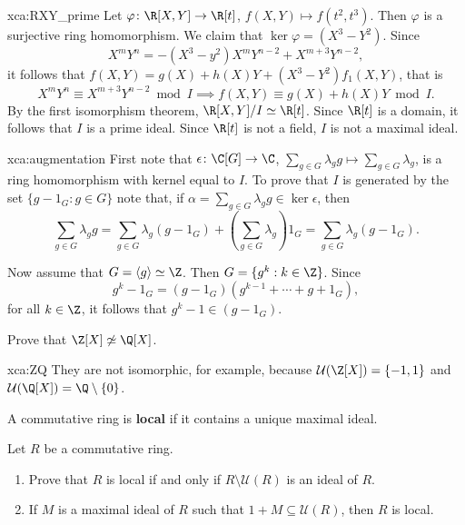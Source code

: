\begin{sol}{xca:RXY_prime}
	Let $\varphi\colon\R[X,Y]\to\R[t]$, $f(X,Y)\mapsto f(t^2,t^3)$. 
	Then $\varphi$ is a surjective ring homomorphism. We claim that
	$\ker\varphi=(X^3-Y^2)$. Since 
	\[
		X^mY^n=-(X^3-y^2)X^mY^{n-2}+X^{m+3}Y^{n-2}, 
	\]
	it follows
	that $f(X,Y)=g(X)+h(X)Y+(X^3-Y^2)f_1(X,Y)$, that is 
	\[
	X^mY^n\equiv X^{m+3}Y^{n-2}\bmod I
	\implies
	f(X,Y)\equiv g(X)+h(X)Y\bmod I.
	\]
	By the first isomorphism theorem, $\R[X,Y]/I\simeq\R[t]$. Since $\R[t]$ is
	a domain, it follows that $I$ is a prime ideal. 
	Since $\R[t]$ is not a
	field, $I$ is not a maximal ideal.
\end{sol}

\begin{sol}{xca:augmentation}
	First note that $\epsilon\colon\C[G]\to\C$, $\sum_{g\in G}\lambda_gg\mapsto \sum_{g\in G}\lambda_g$, 
	is a ring homomorphism with kernel equal to $I$. To prove
	that $I$ is generated by the set $\{g-1_G:g\in G\}$ note that, 
	if $\alpha=\sum_{g\in G}\lambda_gg\in \ker\epsilon$, then 
	\[
		\sum_{g\in G}\lambda_gg=\sum_{g\in G}\lambda_g(g-1_G)+\left(\sum_{g\in G}\lambda_g\right)1_G
		=\sum_{g\in G}\lambda_g(g-1_G).
	\]
	
	Now assume that $G=\langle g\rangle\simeq\Z$. Then $G=\{g^k:k\in\Z\}$. 
	Since 
	\[
		g^k-1_G=(g-1_G)(g^{k-1}+\cdots+g+1_G),
	\]
	for all $k\in\Z$, it follows that $g^k-1\in (g-1_G)$. 
\end{sol}

\begin{exercise}
    \label{xca:ZQ}
    Prove that $\Z[X]\not\simeq\Q[X]$.
\end{exercise}

\begin{sol}{xca:ZQ}
    They are not isomorphic, for example, because
    $\mathcal{U}(\Z[X])=\{-1,1\}$ and $\mathcal{U}(\Q[X])=\Q\setminus\{0\}$. 
\end{sol}

A commutative ring is \textbf{local} if it contains a unique maximal ideal. 

\begin{exercise}
    \label{xca:local}
    Let $R$ be a commutative ring.
    \begin{enumerate}
        \item Prove that $R$ is local if and only if $R\setminus\mathcal{U}(R)$ is an ideal of $R$.
        \item If $M$ is a maximal ideal of $R$ such that $1+M\subseteq\mathcal{U}(R)$, then $R$ is local.
    \end{enumerate}
\end{exercise}

